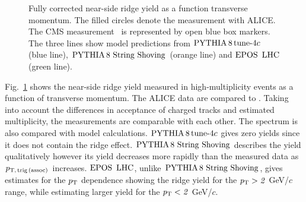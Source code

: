 \begin{figure}[h!]
	\centering
	\caption{ Fully corrected near-side ridge yield as a function transverse momentum. The filled circles denote the measurement with ALICE. The CMS measurement~\cite{Khachatryan:2015lva} is represented by open blue box markers. The three lines show model predictions from $\mathrm{PYTHIA}\,8\,\mathrm{tune}{\text -}4c$ (blue line), ${\mathrm{PYTHIA}\,8~\mathrm{String}~}\mathrm{Shoving}$ (orange line) and ${\mathrm{EPOS}\,~\mathrm{LHC}}$ (green line).}
	\label{fig:PlotYSpect}
\end{figure}

Fig.~\ref{fig:PlotYSpect} shows the near-side ridge yield measured in high-multiplicity events as a function of transverse momentum. The ALICE data are compared to \cite{Khachatryan:2015lva}.
Taking into account the differences in acceptance of charged tracks and estimated multiplicity, the measurements are comparable with each other. The spectrum is also compared with model calculations. $\mathrm{PYTHIA}\,8\,\mathrm{tune}{\text -}4c$ gives zero yields since it does not contain the ridge effect. ${\mathrm{PYTHIA}\,8~\mathrm{String}~}\mathrm{Shoving}$ describes the yield qualitatively however its yield decreases more rapidly than the measured data as $p_\mathrm{T,\,trig\,(assoc)}$ increases. ${\mathrm{EPOS}\,~\mathrm{LHC}}$, unlike ${\mathrm{PYTHIA}\,8~\mathrm{String}~}\mathrm{Shoving}$, gives estimates for the $p_\mathrm{T}$ dependence showing the ridge yield for the $\it{p}_{\rm{T}}>2$ GeV/$c$ range, while estimating larger yield for the $\it{p}_{\rm{T}}<2$ GeV/$c$.

